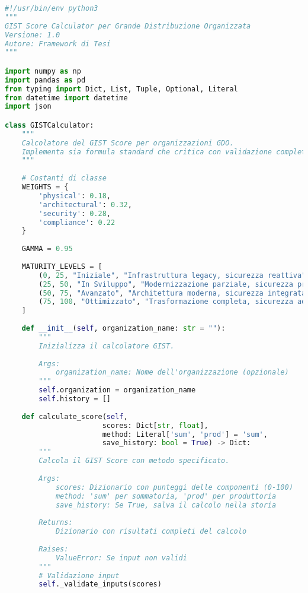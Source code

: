 \begin{lstlisting}[language=Python, caption={Implementazione completa GIST Calculator con validazione e reporting}]
#!/usr/bin/env python3
"""
GIST Score Calculator per Grande Distribuzione Organizzata
Versione: 1.0
Autore: Framework di Tesi
"""

import numpy as np
import pandas as pd
from typing import Dict, List, Tuple, Optional, Literal
from datetime import datetime
import json

class GISTCalculator:
    """
    Calcolatore del GIST Score per organizzazioni GDO.
    Implementa sia formula standard che critica con validazione completa.
    """
    
    # Costanti di classe
    WEIGHTS = {
        'physical': 0.18,
        'architectural': 0.32,
        'security': 0.28,
        'compliance': 0.22
    }
    
    GAMMA = 0.95
    
    MATURITY_LEVELS = [
        (0, 25, "Iniziale", "Infrastruttura legacy, sicurezza reattiva"),
        (25, 50, "In Sviluppo", "Modernizzazione parziale, sicurezza proattiva"),
        (50, 75, "Avanzato", "Architettura moderna, sicurezza integrata"),
        (75, 100, "Ottimizzato", "Trasformazione completa, sicurezza adattiva")
    ]
    
    def __init__(self, organization_name: str = ""):
        """
        Inizializza il calcolatore GIST.
        
        Args:
            organization_name: Nome dell'organizzazione (opzionale)
        """
        self.organization = organization_name
        self.history = []
        
    def calculate_score(self, 
                       scores: Dict[str, float],
                       method: Literal['sum', 'prod'] = 'sum',
                       save_history: bool = True) -> Dict:
        """
        Calcola il GIST Score con metodo specificato.
        
        Args:
            scores: Dizionario con punteggi delle componenti (0-100)
            method: 'sum' per sommatoria, 'prod' per produttoria
            save_history: Se True, salva il calcolo nella storia
            
        Returns:
            Dizionario con risultati completi del calcolo
            
        Raises:
            ValueError: Se input non validi
        """
        # Validazione input
        self._validate_inputs(scores)
        

\end{lstlisting}
